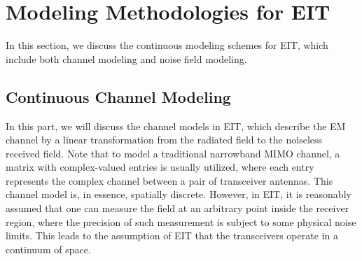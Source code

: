 \documentclass[journal,twocolumn]{IEEEtran}
\begin{document}


\section{Modeling Methodologies for EIT}
In this section, we discuss the continuous modeling schemes for EIT, which include both channel modeling and noise field modeling. 

\subsection{Continuous Channel Modeling}
In this part, we will discuss the channel models in EIT, which describe the EM channel by a linear transformation from the radiated field to the noiseless received field.  
Note that to model a traditional narrowband MIMO channel, a matrix with complex-valued entries is usually utilized, where each entry represents the complex channel between a pair of transceiver antennas. 
This channel model is, in essence, spatially discrete. 
However, in EIT, it is reasonably assumed that one can measure the field at an arbitrary point inside the receiver region, where the precision of such measurement is subject to some physical noise limits. This leads to the assumption of EIT that the transceivers operate in a continuum of space.  
\end{document}
